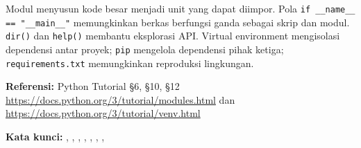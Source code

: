 \documentclass[../main.tex]{subfiles}
\begin{document}
\begin{rangkuman}
Modul menyusun kode besar menjadi unit yang dapat diimpor. Pola \texttt{if \_\_name\_\_ == "\_\_main\_\_"} memungkinkan berkas berfungsi ganda sebagai skrip dan modul. \texttt{dir()} dan \texttt{help()} membantu eksplorasi API. Virtual environment mengisolasi dependensi antar proyek; \texttt{pip} mengelola dependensi pihak ketiga; \texttt{requirements.txt} memungkinkan reproduksi lingkungan.

\textbf{Referensi:} {\small Python Tutorial §6, §10, §12 \url{https://docs.python.org/3/tutorial/modules.html} dan \url{https://docs.python.org/3/tutorial/venv.html}}

\textbf{Kata kunci:} , , , , , , , 
\end{rangkuman}
\end{document}
